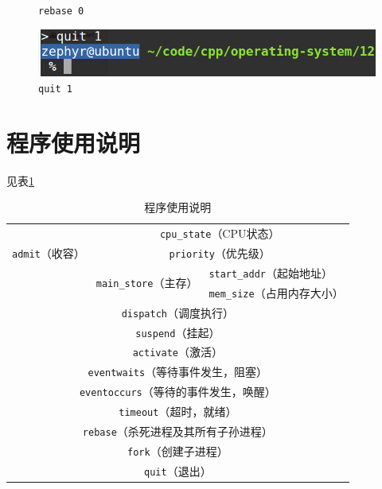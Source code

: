 \documentclass[11pt]{article}
\begin{document}
\begin{center}
\begin{figure}[htbp]
\caption{\texttt{rebase 0}}
\label{fig: rebase0}
\end{figure}
\begin{figure}[htbp]
\includegraphics[width=\textwidth]{quit1.png}
\caption{\texttt{quit 1}}
\label{fig: quit1}
\end{figure}
\end{center}

\section{程序使用说明}
见表\ref{tab: use}

\begin{table}[htbp]
\centering  %
\begin{tabular}{ |l|l|l| }
\hline
\multirow{3}{*}{\texttt{admit}（收容）} & \multicolumn{2}{c|}{\texttt{cpu\_state}（CPU状态）} \\ \cline{2-3} & \multicolumn{2}{c|}{\texttt{priority}（优先级）} \\ \cline{2-3} & \multirow{2}{*}{\texttt{main\_store}（主存）} & \texttt{start\_addr}（起始地址） \\  & & \texttt{mem\_size}（占用内存大小） \\ \hline
\multicolumn{3}{|c|}{\texttt{dispatch}（调度执行）} \\ \hline
\multicolumn{3}{|c|}{\texttt{suspend}（挂起）} \\ \hline
\multicolumn{3}{|c|}{\texttt{activate}（激活）} \\ \hline
\multicolumn{3}{|c|}{\texttt{eventwaits}（等待事件发生，阻塞）} \\ \hline
\multicolumn{3}{|c|}{\texttt{eventoccurs}（等待的事件发生，唤醒）} \\ \hline
\multicolumn{3}{|c|}{\texttt{timeout}（超时，就绪）} \\ \hline
\multicolumn{3}{|c|}{\texttt{rebase}（杀死进程及其所有子孙进程）} \\ \hline
\multicolumn{3}{|c|}{\texttt{fork}（创建子进程）} \\ \hline
\multicolumn{3}{|c|}{\texttt{quit}（退出）} \\ \hline
\end{tabular}
\caption{程序使用说明\label{tab: use}}
\end{table}
\end{document}
